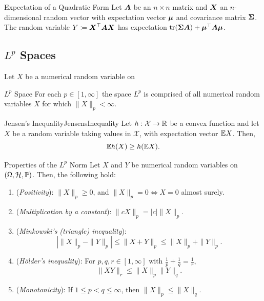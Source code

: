 \begin{prop}{Expectation of a Quadratic Form}{}
	Let \(\boldsymbol{A}\) be an \(n \times n\) matrix and \(\boldsymbol{X}\) an \(n\)-dimensional random vector with expectation vector \(\boldsymbol{\mu}\) and covariance matrix \(\boldsymbol{\Sigma}\). The random variable \(Y \coloneqq \boldsymbol{X}^{\top} \boldsymbol{A} \boldsymbol{X}\) has expectation \(\mathrm{tr}(\boldsymbol{\Sigma} \boldsymbol{A}) + \boldsymbol{\mu}^{\top} \boldsymbol{A} \boldsymbol{\mu}\).
\end{prop}

\subsection{\(L^p\) Spaces}
Let \(X\) be a numerical random variable on

\begin{defn}{\(L^p\) Space}{}
	For each \(p \in [1, \infty]\) the space \(L^p\) is comprised of all numerical random variables \(X\) for which \(\|X\|_p < \infty\).
\end{defn}

\begin{lem}{Jensen's Inequality}{JensensInequality}
	Let \(h : \mathcal{X} \to \mathbb{R}\) be a convex function and let \(X\) be a random variable taking values in \(\mathcal{X}\), with expectation vector \(\mathbb{E} X\). Then,
	\begin{equation*}
		\mathbb{E} h(X) \ge h(\mathbb{E} X).
	\end{equation*}
\end{lem}

\begin{thm}{Properties of the \(L^p\) Norm}{}
	Let \(X\) and \(Y\) be numerical random variables on \((\Omega, \mathcal{H}, \mathbb{P})\). Then, the following hold:
	\begin{enumerate}
		\item (\textit{Positivity}): \(\|X\|_p \ge 0\), and \(\|X\|_p = 0 \iff X = 0\) almost surely.
		\item (\textit{Multiplication by a constant}): \(\|c X\|_p = |c| \|X\|_p\).
		\item (\textit{Minkowski's (triangle) inequality}):
		      \begin{equation*}
			      |\|X\|_p - \|Y\|_p| \le \|X + Y\|_p \le \|X\|_p + \|Y\|_p.
		      \end{equation*}
		\item (\textit{Hölder's inequality}): For \(p, q, r \in [1, \infty]\) with \(\frac{1}{p} + \frac{1}{q} = \frac{1}{r}\),
		      \begin{equation}
			      \|XY\|_r \le \|X\|_p \|Y\|_q.
			      \label{eq:HoldersInequality}
		      \end{equation}
		\item (\textit{Monotonicity}): If \(1 \le p < q \le \infty\), then \(\|X\|_p \le \|X\|_q\).
	\end{enumerate}
\end{thm}

